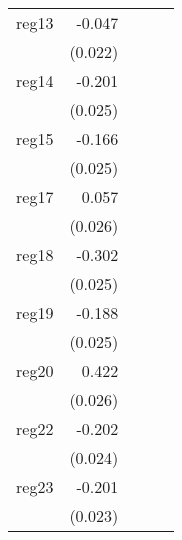 {\begin{longtable}{l*{4}{D{.}{.}{-1}}}
\addlinespace
reg13       &      -0.047\sym{*}  &                     &                     &                     \\
            &     (0.022)         &                     &                     &                     \\
\addlinespace
reg14       &      -0.201\sym{***}&                     &                     &                     \\
            &     (0.025)         &                     &                     &                     \\
\addlinespace
reg15       &      -0.166\sym{***}&                     &                     &                     \\
            &     (0.025)         &                     &                     &                     \\
\addlinespace
reg17       &       0.057\sym{*}  &                     &                     &                     \\
            &     (0.026)         &                     &                     &                     \\
\addlinespace
reg18       &      -0.302\sym{***}&                     &                     &                     \\
            &     (0.025)         &                     &                     &                     \\
\addlinespace
reg19       &      -0.188\sym{***}&                     &                     &                     \\
            &     (0.025)         &                     &                     &                     \\
\addlinespace
reg20       &       0.422\sym{***}&                     &                     &                     \\
            &     (0.026)         &                     &                     &                     \\
\addlinespace
reg22       &      -0.202\sym{***}&                     &                     &                     \\
            &     (0.024)         &                     &                     &                     \\
\addlinespace
reg23       &      -0.201\sym{***}&                     &                     &                     \\
            &     (0.023)         &                     &                     &                     \\

\end{longtable}}

